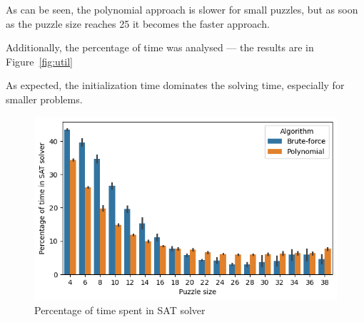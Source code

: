 \documentclass[12pt]{article}
\begin{document}
As can be seen, the polynomial approach is slower for small puzzles, but as soon as the puzzle size reaches 25 it becomes the faster approach.

Additionally, the percentage of time was analysed — the results are in Figure~\ref{fig:util}

As expected, the initialization time dominates the solving time, especially for smaller problems.

\begin{figure}[H]
  \includegraphics[scale=0.5]{util.png}
  \centering
  \caption{Percentage of time spent in SAT solver}
  \label{fig:bench}
\end{figure}


\end{document}
